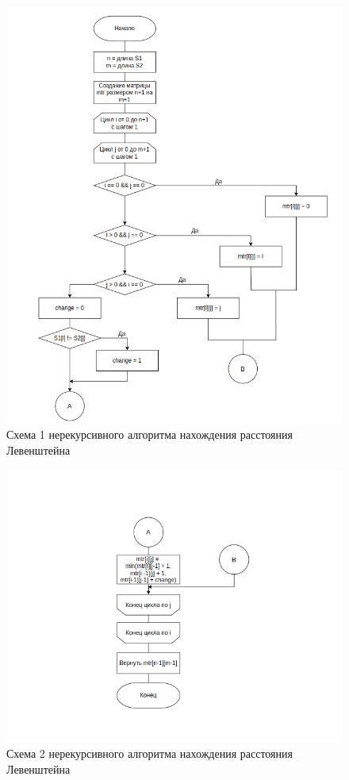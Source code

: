 \begin{figure}[h]
	\centering
	\includegraphics[width=\textwidth]{img/levmatr1.png}
	\caption{Схема 1 нерекурсивного алгоритма нахождения расстояния Левенштейна}
	\label{fig:Liter1}
\end{figure}

\clearpage

\begin{figure}[h]
	\centering
	\includegraphics[width=\textwidth]{img/levmatr2.png}
	\caption{Схема 2 нерекурсивного алгоритма нахождения расстояния Левенштейна}
	\label{fig:Liter2}
\end{figure}

